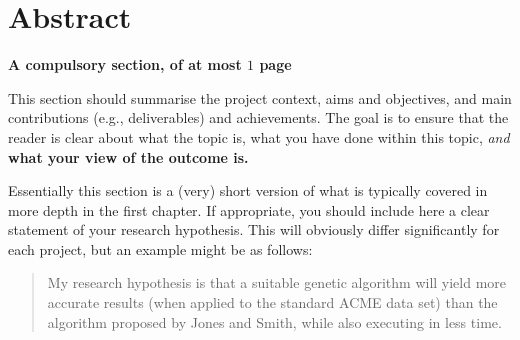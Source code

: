 \documentclass[ %
                    author={Revalda Putawara},
                supervisor={Dr. James Pope},
                    degree={MSc},
                     title={Robustness of Bayesian Neural Networks Design Choices Against Weight and Bias Perturbation Induced by Single Event Upsets (SEUs)},
                      type={},
                      year={2025}]{dissertation}
\begin{document}

\frontmatter


\makedecl


\tableofcontents
\listoffigures
\listoftables
\listofalgorithms



\chapter*{Abstract}

\iffalse
{\bf A compulsory section, of at most $1$ page} 
\vspace{1cm} 

\noindent
This section should summarise the project context, aims and objectives,
and main contributions (e.g., deliverables) and achievements.  The goal is to ensure that the 
reader is clear about what the topic is, what you have done within this 
topic, {\em and}\/ {\bf what your view of the outcome is.}

Essentially 
this section is a (very) short version of what is typically covered in more depth in the first 
chapter.  If appropriate, you should include here  
a clear statement of your research hypothesis.  This will obviously differ significantly
for each project, but an example might be as follows:

\begin{quote}
My research hypothesis is that a suitable genetic algorithm will yield
more accurate results (when applied to the standard ACME data set) than 
the algorithm proposed by Jones and Smith, while also executing in less
time.
\end{quote}
\end{document}
